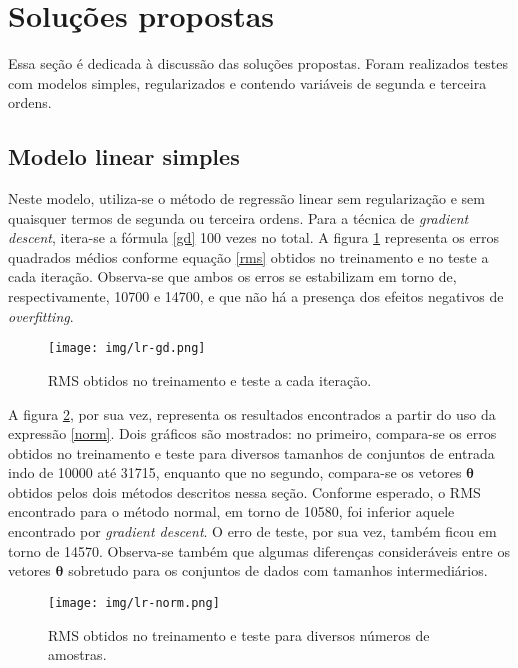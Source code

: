 \documentclass[10pt,twocolumn,letterpaper]{article}
\begin{document}
\section{Soluções propostas}

Essa seção é dedicada à discussão das soluções propostas. Foram realizados testes com modelos simples, regularizados e contendo variáveis de segunda e terceira ordens.

\subsection {Modelo linear simples}

Neste modelo, utiliza-se o método de regressão linear sem regularização e sem quaisquer termos de segunda ou terceira ordens. Para a técnica de \textit{gradient descent}, itera-se a fórmula \ref{gd} 100 vezes no total. A figura \ref{fig:lr-gd} representa os erros quadrados médios conforme equação \ref{rms} obtidos no treinamento e no teste a cada iteração. Observa-se que ambos os erros se estabilizam em torno de, respectivamente, 10700 e 14700, e que não há a presença dos efeitos negativos de \textit {overfitting}.

\begin{figure}
    \centering
    \texttt{[image: img/lr-gd.png]}
    \caption{RMS obtidos no treinamento e teste a cada iteração.}
    \label{fig:lr-gd}
\end{figure}

A figura \ref{fig:lr-norm}, por sua vez, representa os resultados encontrados a partir do uso da expressão \ref{norm}. Dois gráficos são mostrados: no primeiro, compara-se os erros obtidos no treinamento e teste para diversos tamanhos de conjuntos de entrada indo de 10000 até 31715, enquanto que no segundo, compara-se os vetores \(\bm{\theta}\) obtidos pelos dois métodos descritos nessa seção. Conforme esperado, o RMS encontrado para o método normal, em torno de 10580, foi inferior aquele encontrado por \textit{gradient descent}. O erro de teste, por sua vez, também ficou em torno de 14570. Observa-se também que algumas diferenças consideráveis entre os vetores \(\bm{\theta}\) sobretudo para os conjuntos de dados com tamanhos intermediários.

\begin{figure}
    \centering
    \texttt{[image: img/lr-norm.png]}
    \caption{RMS obtidos no treinamento e teste para diversos números de amostras.}
    \label{fig:lr-norm}
\end{figure}
\end{document}
